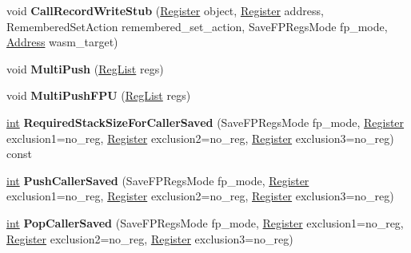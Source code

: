 \begin{DoxyCompactItemize}
\item 
\mbox{\label{classv8_1_1internal_1_1TurboAssembler_a2bc1271b1999cb2ee3784489515931b6}} 
void {\bfseries Call\+Record\+Write\+Stub} (\mbox{\hyperlink{classv8_1_1internal_1_1Register}{Register}} object, \mbox{\hyperlink{classv8_1_1internal_1_1Register}{Register}} address, Remembered\+Set\+Action remembered\+\_\+set\+\_\+action, Save\+F\+P\+Regs\+Mode fp\+\_\+mode, \mbox{\hyperlink{classuintptr__t}{Address}} wasm\+\_\+target)
\item 
\mbox{\label{classv8_1_1internal_1_1TurboAssembler_aa307d4d701ec326de7bba1dddb94582a}} 
void {\bfseries Multi\+Push} (\mbox{\hyperlink{classuint32__t}{Reg\+List}} regs)
\item 
\mbox{\label{classv8_1_1internal_1_1TurboAssembler_ae3411f3b22363007c2f7aa94528c8371}} 
void {\bfseries Multi\+Push\+F\+PU} (\mbox{\hyperlink{classuint32__t}{Reg\+List}} regs)
\item 
\mbox{\label{classv8_1_1internal_1_1TurboAssembler_ade281f6d328e2fdd51963e91bda13365}} 
\mbox{\hyperlink{classint}{int}} {\bfseries Required\+Stack\+Size\+For\+Caller\+Saved} (Save\+F\+P\+Regs\+Mode fp\+\_\+mode, \mbox{\hyperlink{classv8_1_1internal_1_1Register}{Register}} exclusion1=no\+\_\+reg, \mbox{\hyperlink{classv8_1_1internal_1_1Register}{Register}} exclusion2=no\+\_\+reg, \mbox{\hyperlink{classv8_1_1internal_1_1Register}{Register}} exclusion3=no\+\_\+reg) const
\item 
\mbox{\label{classv8_1_1internal_1_1TurboAssembler_a05799e0b139129becdabdf8af8e18810}} 
\mbox{\hyperlink{classint}{int}} {\bfseries Push\+Caller\+Saved} (Save\+F\+P\+Regs\+Mode fp\+\_\+mode, \mbox{\hyperlink{classv8_1_1internal_1_1Register}{Register}} exclusion1=no\+\_\+reg, \mbox{\hyperlink{classv8_1_1internal_1_1Register}{Register}} exclusion2=no\+\_\+reg, \mbox{\hyperlink{classv8_1_1internal_1_1Register}{Register}} exclusion3=no\+\_\+reg)
\item 
\mbox{\label{classv8_1_1internal_1_1TurboAssembler_a5f104f3d3c969b063fb4d1dfdc643b1c}} 
\mbox{\hyperlink{classint}{int}} {\bfseries Pop\+Caller\+Saved} (Save\+F\+P\+Regs\+Mode fp\+\_\+mode, \mbox{\hyperlink{classv8_1_1internal_1_1Register}{Register}} exclusion1=no\+\_\+reg, \mbox{\hyperlink{classv8_1_1internal_1_1Register}{Register}} exclusion2=no\+\_\+reg, \mbox{\hyperlink{classv8_1_1internal_1_1Register}{Register}} exclusion3=no\+\_\+reg)

\end{DoxyCompactItemize}
